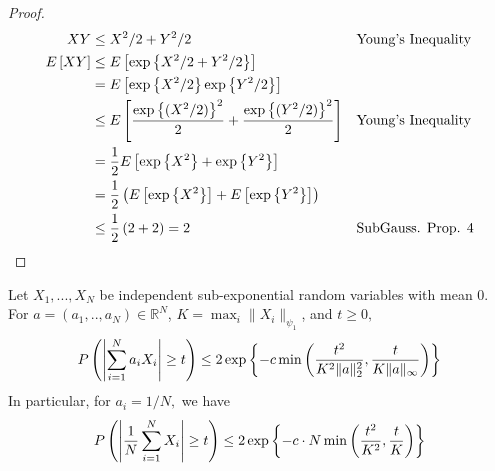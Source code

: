 \begin{proof}
\begin{align*}
XY &\leq X^2/2 + Y^2/2 && \text{Young's Inequality} \\ 
E\left[XY \right] &\leq E\left[\exp\left\{X^2/2 + Y^2/2 \right\} \right] && \text{} \\ 
&= E\left[\exp\left\{X^2/2 \right\} \exp\left\{Y^2/2 \right\} \right] && \text{} \\ 
&\leq E\left[\frac{\exp\left\{(X^2/2) \right\}^2}{2} + \frac{\exp\left\{(Y^2/2) \right\}^2}{2} \right] && \text{Young's Inequality} \\
&= \frac{1}{2} E\left[\exp\left\{X^2 \right\} + \exp\left\{Y^2 \right\} \right] \\ 
&= \frac{1}{2} \left(E\left[\exp\left\{X^2 \right\} \right] + E\left[\exp\left\{Y^2 \right\} \right]\right) \\ 
&\leq \frac{1}{2} \left(2 + 2\right) = 2 && \text{SubGauss. Prop. 4}
\end{align*}
\end{proof}


\begin{tcolorbox}
\begin{theorem}
Let $X_1, ..., X_N$ be independent sub-exponential random variables with mean 0. For $a = (a_1, .., a_N) \in \mathbb{R}^N$, $K = \max_i \|X_i\|_{\psi_1}$, and $t \geq 0, $
\begin{equation}
    P\left(\left|\sum_{i=1}^{N}a_i X_i\right| \geq t \right) \leq 2\exp\left\{-c \min\left(\frac{t^2}{K^2\|a\|_{2}^{2}}, \frac{t}{K \|a\|_{\infty}}\right) \right\}
\end{equation}
In particular, for $a_i = 1/N, $ we have
\begin{equation}
    P\left(\left|\frac{1}{N} \sum_{i=1}^{N} X_i\right| \geq t \right) \leq 2\exp\left\{-c\cdot N \min\left(\frac{t^2}{K^2}, \frac{t}{K}\right) \right\}
\end{equation}
\end{theorem}
\end{tcolorbox}


